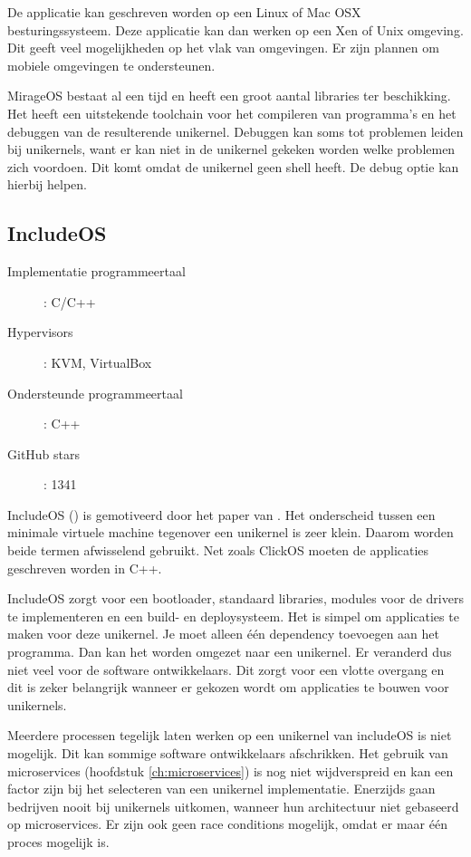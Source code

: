 De applicatie kan geschreven worden op een Linux of Mac OSX besturingssysteem. Deze applicatie kan dan werken op een Xen of Unix omgeving. Dit geeft veel mogelijkheden op het vlak van omgevingen. Er zijn plannen om mobiele omgevingen te ondersteunen.

MirageOS bestaat al een tijd en heeft een groot aantal libraries ter beschikking. Het heeft een uitstekende toolchain voor het compileren van programma's en het debuggen van de resulterende unikernel. Debuggen kan soms tot problemen leiden bij unikernels, want er kan niet in de unikernel gekeken worden welke problemen zich voordoen. Dit komt omdat de unikernel geen shell heeft. De debug optie kan hierbij helpen.

\subsection{IncludeOS}
\begin{description}
  \item [Implementatie programmeertaal]: C/C++
  \item [Hypervisors]: KVM, VirtualBox
  \item [Ondersteunde programmeertaal]: C++
  \item [GitHub stars]: 1341
\end{description}

IncludeOS (\cite{oslo_and_akershus_university_college_hioa-cs/includeos_????}) is gemotiveerd door het paper van \cite{bratterud_maximizing_2013}. Het onderscheid tussen een minimale virtuele machine tegenover een unikernel is zeer klein. Daarom worden beide termen afwisselend gebruikt. Net zoals ClickOS moeten de applicaties geschreven worden in C++.

IncludeOS zorgt voor een bootloader, standaard libraries, modules voor de drivers te implementeren en een build- en deploysysteem. Het is simpel om applicaties te maken voor deze unikernel. Je moet alleen één dependency toevoegen aan het programma. Dan kan het worden omgezet naar een unikernel. Er veranderd dus niet veel voor de software ontwikkelaars. Dit zorgt voor een vlotte overgang en dit is zeker belangrijk wanneer er gekozen wordt om applicaties te bouwen voor unikernels.

Meerdere processen tegelijk laten werken op een unikernel van includeOS is niet mogelijk. Dit kan sommige software ontwikkelaars afschrikken. Het gebruik van microservices (hoofdstuk \ref{ch:microservices}) is nog niet wijdverspreid en kan een factor zijn bij het selecteren van een unikernel implementatie. Enerzijds gaan bedrijven nooit bij unikernels uitkomen, wanneer hun architectuur niet gebaseerd op microservices. Er zijn ook geen race conditions mogelijk, omdat er maar één proces mogelijk is.

